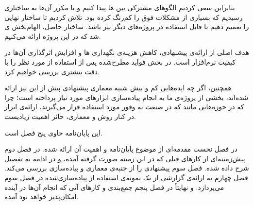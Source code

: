 بنابراین سعی کردیم الگوهای مشترکی بین ‌ها پیدا کنیم و با  مکرر آن‌ها به ساختاری رسیدیم که بسیاری از مشکلات فوق را کم‌رنگ کرده بود. تلاش کردیم تا ساختار نهایی را تعمیم دهیم تا قابل استفاده در پروژه‌های دیگر نیز باشد. ساختار حاصل، الهام‌بخش  ی شد که در این پروژه ارائه می‌کنیم.

هدف اصلی از ارائه‌ی   پیشنهادی، کاهش هزینه‌ی نگهداری ها و افزایش اثرگذاری آن‌ها در کیفیت نرم‌افزار است. در بخش  فواید مطرح‌شده پس از استفاده از  مورد نظر را با دقت بیشتری بررسی خواهیم کرد.

همچنین، اگر چه ایده‌هایی کم و بیش شبیه معماری  پیشنهادی پیش از این نیز ارائه شده‌اند، بخشی از پروژه‌ی ما به انجام پیاده‌سازی ابزارهای مورد نیاز پرداخته است؛ چرا که در حوزه‌هایی مانند  که در صنعت به وفور مورد استفاده قرار می‌گیرند، ارائه‌ی ابزار در کنار روش و معماری، حائز اهمیت زیادیست.


این پایان‌نامه حاوی پنج فصل است.

در فصل نخست مقدمه‌ای از موضوع پایان‌نامه و اهمیت آن ارائه شده. در فصل دوم پیش‌زمینه‌ای از کارهای قبلی که در این زمینه صورت گرفته آمده، و در ادامه  به تفصیل شرح داده شده. فصل سوم   پیشنهادی را از جنبه‌ی معماری و پیاده‌سازی بررسی می‌کند. فصل چهارم به ارائه‌ی گزارشی از یک نمونه‌ی استفاده از  پیاده‌سازی‌شده در فصل سوم می‌پردازد. و نهایتاً در فصل پنجم جمع‌بندی و کارهای آتی که انجام آن‌ها در آینده امکان‌پذیر خواهد بود آمده.

